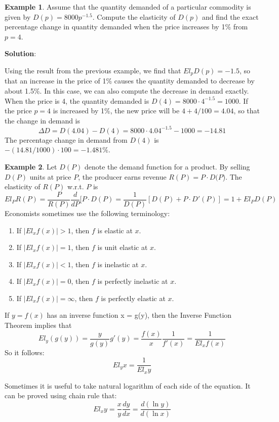 \documentclass[10pt,a4paper]{book}
\theoremstyle{definition}\newtheorem{definition}{Definition}
\theoremstyle{definition}\newtheorem{fact}{Fact}
\theoremstyle{definition}\newtheorem{ex}{Ex.}
\theoremstyle{definition}\newtheorem{project}{Project}
\theoremstyle{definition}\newtheorem{problem}{Problem}
\theoremstyle{definition}\newtheorem{example}{Example}
\numberwithin{theorem}{chapter}
\numberwithin{corollary}{chapter}
\numberwithin{assumption}{chapter}
\numberwithin{definition}{chapter}
\numberwithin{prop}{chapter}
\numberwithin{notation}{chapter}
\numberwithin{problem}{chapter}
\numberwithin{example}{chapter}
\numberwithin{fact}{chapter}
\numberwithin{ex}{chapter}
\begin{document}
	\begin{example}
		Assume that the quantity demanded of a particular commodity is given by $D(p) = 8000p^{-1.5}$. Compute the elasticity of $D(p)$ and find the exact percentage change in quantity demanded when the price increases by 1\% from $p = 4$.
		
		\textbf{Solution}:
		
		Using the result from the previous example, we find that $El_p D(p) = -1.5$, so that an increase in the price of 1\% causes the quantity demanded to decrease by about 1.5\%. In this case, we can also compute the decrease in demand exactly. When the price is 4, the quantity demanded is $D(4) = 8000 \cdot 4^{-1.5} = 1000$. If the price $p = 4$ is increased by 1\%, the new price will be $4 + 4/100 = 4.04$, so that the change in demand is    
		$$\Delta D = D(4.04) - D(4) = 8000 \cdot 4.04^{-1.5} - 1000 = -14.81$$
		The percentage change in demand from $D(4)$ is $-(14.81/1000) \cdot 100 = -1.481\%$.
	\end{example}
	
	\begin{example}
		Let $D(P)$ denote the demand function for a product. By selling $D(P)$ units at price $P$, the producer earns revenue $R(P) = P \cdot D(P$). The elasticity of $R(P)$ w.r.t. $P$ is
		$$El_P R(P) = \frac{P}{R(P)}\frac{d}{dP}[P \cdot D(P) = \frac{1}{D(P)}[D(P) + P \cdot D'(P)] = 1 + El_PD(P)$$
		Economists sometimes use the following terminology:
		\begin{enumerate}
			\item If $|El_x f (x)| > 1$, then $f$ is elastic at $x$.
			\item If $|El_x f (x)| = 1$, then $f$ is unit elastic at $x$.
			\item If $|El_x f (x)| < 1$, then $f$ is inelastic at $x$.
			\item If $|El_x f (x)| = 0$, then $f$ is perfectly inelastic at $x$.
			\item If $|El_x f (x)| = \infty$, then $f$ is perfectly elastic at $x$.
		\end{enumerate}
		If $y = f (x)$ has an inverse function x = g(y), then the Inverse Function Theorem implies that
		$$El_y(g(y)) = \frac{y}{g(y)}g'(y) = \frac{f(x)}{x}\frac{1}{f'(x)} = \frac{1}{El_xf(x)}$$
		So it follows:
		$$El_yx = \frac{1}{El_xy}$$
	\end{example}
	
	Sometimes it is useful to take natural logarithm of each side of the equation. It can be proved using chain rule that:
	$$El_x y = \frac{x}{y}\frac{dy}{dx} = \frac{d(\ln y)}{d(\ln x)}$$
	
\end{document}
